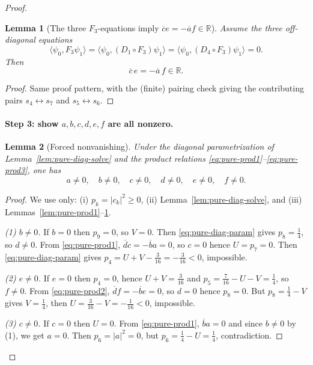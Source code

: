 \documentclass[11pt]{article}
\newtheorem{lemma}{Lemma}
\begin{document}
\begin{proof}
\begin{lemma}[The three $F_3$-equations imply $\overline{c}e=-\overline{a}f\in\mathbb R$]
\label{lem:pure-prod3}
Assume the three off-diagonal equations
\[
\langle \psi_0,F_3\psi_1\rangle=\langle \psi_0,(D_1\!\circ F_3)\psi_1\rangle=\langle \psi_0,(D_4\!\circ F_3)\psi_1\rangle=0.
\]
Then
\begin{equation}
\overline{c}\,e=-\overline{a}\,f\in\mathbb R.
\label{eq:pure-prod3}
\end{equation}
\end{lemma}

\begin{proof}
Same proof pattern, with the (finite) pairing check giving the contributing pairs $s_4\leftrightarrow s_7$ and $s_5\leftrightarrow s_6$.
\end{proof}

\paragraph{Step 3: show $a,b,c,d,e,f$ are all nonzero.}

\begin{lemma}[Forced nonvanishing]
\label{lem:pure-nonzero}
Under the diagonal parametrization of Lemma~\ref{lem:pure-diag-solve} and the product relations
\eqref{eq:pure-prod1}--\eqref{eq:pure-prod3}, one has
\[
a\neq 0,\quad b\neq 0,\quad c\neq 0,\quad d\neq 0,\quad e\neq 0,\quad f\neq 0.
\]
\end{lemma}

\begin{proof}
We use only: (i) $p_k=|c_k|^2\ge 0$, (ii) Lemma~\ref{lem:pure-diag-solve}, and (iii) Lemmas~\ref{lem:pure-prod1}--\ref{lem:pure-prod3}.

\emph{(1) $b\neq 0$.}
If $b=0$ then $p_9=0$, so $V=0$.
Then \eqref{eq:pure-diag-param} gives $p_8=\frac14$, so $d\neq 0$.
From \eqref{eq:pure-prod1}, $\overline{d}c=-\overline{b}a=0$, so $c=0$ hence $U=p_7=0$.
Then \eqref{eq:pure-diag-param} gives $p_4=U+V-\frac{3}{16}=-\frac{3}{16}<0$, impossible.

\emph{(2) $e\neq 0$.}
If $e=0$ then $p_4=0$, hence $U+V=\frac{3}{16}$ and $p_5=\frac{7}{16}-U-V=\frac14$, so $f\neq 0$.
From \eqref{eq:pure-prod2}, $\overline{d}f=-\overline{b}e=0$, so $d=0$ hence $p_8=0$.
But $p_8=\frac14-V$ gives $V=\frac14$, then $U=\frac{3}{16}-V=-\frac{1}{16}<0$, impossible.

\emph{(3) $c\neq 0$.}
If $c=0$ then $U=0$. From \eqref{eq:pure-prod1}, $\overline{b}a=0$ and since $b\neq 0$ by (1), we get $a=0$.
Then $p_6=|a|^2=0$, but $p_6=\frac14-U=\frac14$, contradiction.


\end{proof}
\end{proof}
\end{document}
